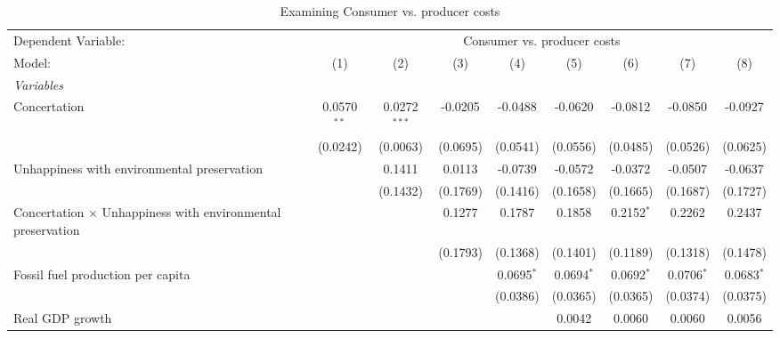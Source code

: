 
\begin{table}[htbp]
   \caption{Examining Consumer vs. producer costs}
   \centering
   \begin{tabular}{lcccccccc}
      \tabularnewline \midrule \midrule
      Dependent Variable: & \multicolumn{8}{c}{Consumer vs. producer costs}\\
      Model:                                                             & (1)           & (2)            & (3)      & (4)          & (5)          & (6)          & (7)           & (8)\\  
      \midrule
      \emph{Variables}\\
      Concertation                                                       & 0.0570$^{**}$ & 0.0272$^{***}$ & -0.0205  & -0.0488      & -0.0620      & -0.0812      & -0.0850       & -0.0927\\   
                                                                         & (0.0242)      & (0.0063)       & (0.0695) & (0.0541)     & (0.0556)     & (0.0485)     & (0.0526)      & (0.0625)\\   
      Unhappiness with environmental preservation                        &               & 0.1411         & 0.0113   & -0.0739      & -0.0572      & -0.0372      & -0.0507       & -0.0637\\   
                                                                         &               & (0.1432)       & (0.1769) & (0.1416)     & (0.1658)     & (0.1665)     & (0.1687)      & (0.1727)\\   
      Concertation $\times$ Unhappiness with environmental preservation  &               &                & 0.1277   & 0.1787       & 0.1858       & 0.2152$^{*}$ & 0.2262        & 0.2437\\   
                                                                         &               &                & (0.1793) & (0.1368)     & (0.1401)     & (0.1189)     & (0.1318)      & (0.1478)\\   
      Fossil fuel production per capita                                  &               &                &          & 0.0695$^{*}$ & 0.0694$^{*}$ & 0.0692$^{*}$ & 0.0706$^{*}$  & 0.0683$^{*}$\\   
                                                                         &               &                &          & (0.0386)     & (0.0365)     & (0.0365)     & (0.0374)      & (0.0375)\\   
      Real GDP growth                                                    &               &                &          &              & 0.0042       & 0.0060       & 0.0060        & 0.0056\\   

\end{tabular}
\end{table}
